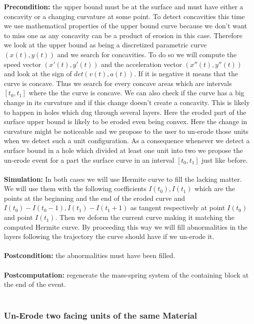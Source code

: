 \documentclass[12pt, a4paper]{report} %
\begin{document}
\textbf{Precondition:} the upper bound must be at the surface and must have either a concavity or a changing curvature at some point. To detect concavities this time we use mathematical properties of the upper bound curve because we don't want to miss one as any concavity can be a product of erosion in this case. Therefore we look at the upper bound as being a discretized parametric curve $(x(t),y(t))$ and we search for concavities. To do so we will compute the speed vector $(x'(t),y'(t))$ and the acceleration vector $(x''(t),y''(t))$ and look at the sign of $det(v(t),a(t))$. If it is negative it means that the curve is concave. Thus we search for every concave areas which are intervals $[t_0,t_1]$ where the the curve is concave. We can also check if the curve has a big change in its curvature and if this change doesn't create a concavity. This is likely to happen  in holes which dug through several layers. Here the eroded part of the surface upper bound is likely to be eroded even being convex. Here the change in curvature might be noticeable and we propose to the user to un-erode those units when we detect such a unit configuration. As a consequence whenever we detect a surface bound in a hole which divided at least one unit into two we propose the un-erode event for a part the surface curve in an interval $[t_0,t_1]$ just like before.\\\\
\textbf{Simulation:} In both cases we will use Hermite curve to fill the lacking matter. We will use them with the following coefficients $I(t_0), I(t_1)$ which are the points at the beginning and the end of the eroded curve and $I(t_0) - I(t_0 - 1), I(t_1) - I(t_1 + 1)$  as tangent respectively at point $I(t_0)$ and point $I(t_1)$. Then we deform the current curve making it matching the computed Hermite curve. By proceeding this way we will fill abnormalities in the layers following the trajectory the curve should have if we un-erode it.\\\\
\textbf{Postcondition:} the abnormalities must have been filled.\\\\
\textbf{Postcomputation:} regenerate the mass-spring system of the containing block at the end of the event.\\\\

\subsubsection{Un-Erode two facing units of the same Material}
\end{document}
